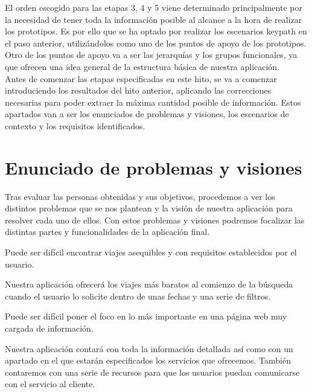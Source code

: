 El orden escogido para las etapas 3, 4 y 5 viene determinado principalmente por la necesidad de tener toda la información posible al alcance a la hora de realizar los
prototipos. Es por ello que se ha optado por realizar los escenarios keypath en el paso anterior, utilizándolos como uno de los puntos de apoyo de los prototipos. Otro
de los puntos de apoyo va a ser las jerarquías y los grupos funcionales, ya que ofrecen una idea general de la estructura básica de nuestra aplicación. \\

Antes de comenzar las etapas especificadas en este hito, se va a comenzar introduciendo los resultados del hito anterior, aplicando las correcciones necesarias para poder
extraer la máxima cantidad posible de información. Estos apartados van a ser los enunciados de problemas y visiones, los escenarios de contexto y los requisitos identificados.

\section{Enunciado de problemas y visiones}
Tras evaluar las personas obtenidas y sus objetivos, procedemos a ver los distintos problemas que se nos plantean y la visión de nuestra aplicación para resolver cada uno de ellos. Con estos problemas y visiones podremos focalizar las distintas partes y funcionalidades de la aplicación final.

\begin{problema}

      Puede ser difícil encontrar viajes asequibles y con requisitos establecidos por
      el usuario.

            {\centering
                  \begin{vision} \justifying\noindent
                        Nuestra aplicación ofrecerá los viajes más baratos al comienzo de la búsqueda cuando el usuario lo solicite dentro de unas fechas y una serie de filtros.

                  \end{vision}}
\end{problema}

\vspace{0.5cm}

\begin{problema}
      Puede ser difícil poner el foco en lo más importante en una página web muy cargada de información.

      {\centering
      \begin{vision}\justifying\noindent
            Nuestra aplicación contará con toda la información detallada así como con un apartado en el que estarán especificados los servicios que ofrecemos. También contaremos con una serie de recursos para que los usuarios puedan comunicarse con el servicio al cliente.
      \end{vision}}
\end{problema}

